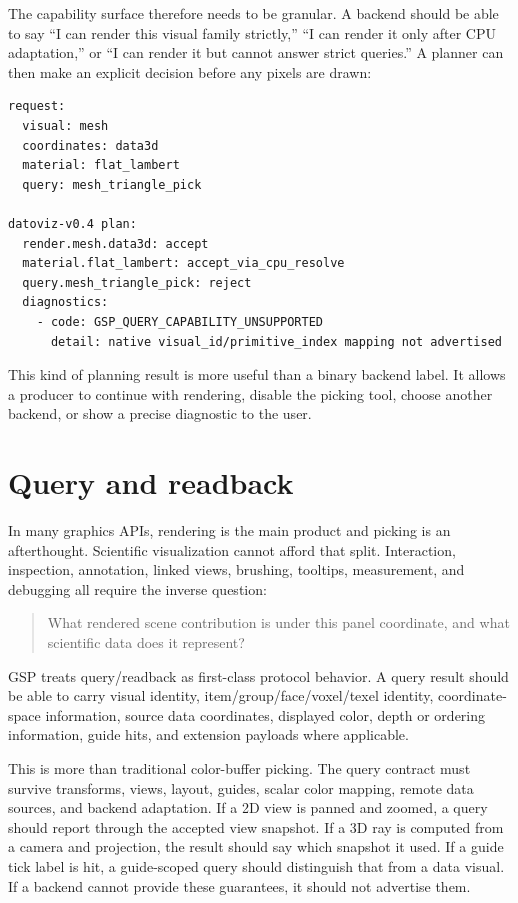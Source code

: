 \documentclass[a4paper,11pt]{article}
\newcommand{\gsp}{GSP\xspace}
\begin{document}
The capability surface therefore needs to be granular. A backend should be able to say ``I can
render this visual family strictly,'' ``I can render it only after CPU adaptation,'' or ``I can
render it but cannot answer strict queries.'' A planner can then make an explicit decision before
any pixels are drawn:

\begin{lstlisting}[float=htbp,caption={Illustrative capability-driven planning result.}]
request:
  visual: mesh
  coordinates: data3d
  material: flat_lambert
  query: mesh_triangle_pick

datoviz-v0.4 plan:
  render.mesh.data3d: accept
  material.flat_lambert: accept_via_cpu_resolve
  query.mesh_triangle_pick: reject
  diagnostics:
    - code: GSP_QUERY_CAPABILITY_UNSUPPORTED
      detail: native visual_id/primitive_index mapping not advertised
\end{lstlisting}

This kind of planning result is more useful than a binary backend label. It allows a producer to
continue with rendering, disable the picking tool, choose another backend, or show a precise
diagnostic to the user.

\section{Query and readback}

In many graphics APIs, rendering is the main product and picking is an afterthought. Scientific
visualization cannot afford that split. Interaction, inspection, annotation, linked views, brushing,
tooltips, measurement, and debugging all require the inverse question:

\begin{quote}
What rendered scene contribution is under this panel coordinate, and what scientific data does it
represent?
\end{quote}

\gsp treats query/readback as first-class protocol behavior. A query result should be able to carry
visual identity, item/group/face/voxel/texel identity, coordinate-space information, source data
coordinates, displayed color, depth or ordering information, guide hits, and extension payloads
where applicable.

This is more than traditional color-buffer picking. The query contract must survive transforms,
views, layout, guides, scalar color mapping, remote data sources, and backend adaptation. If a 2D
view is panned and zoomed, a query should report through the accepted view snapshot. If a 3D ray is
computed from a camera and projection, the result should say which snapshot it used. If a guide tick
label is hit, a guide-scoped query should distinguish that from a data visual. If a backend cannot
provide these guarantees, it should not advertise them.
\end{document}
